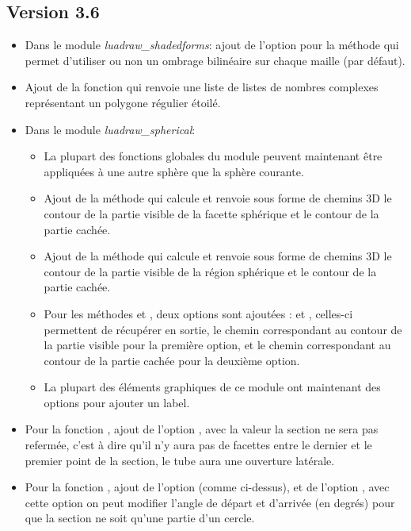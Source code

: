 \subsection{Version 3.6}
\begin{itemize}
    \item Dans le module \emph{luadraw\_shadedforms}: ajout de l'option  pour la méthode  qui permet d'utiliser ou non un ombrage bilinéaire sur chaque maille (\true par défaut).

    \item Ajout de la fonction  qui renvoie une liste de listes de nombres complexes représentant un polygone régulier étoilé.

    \item Dans le module \emph{luadraw\_spherical}:
    \begin{itemize}
        \item La plupart des fonctions globales du module peuvent maintenant être appliquées à une autre sphère que la sphère courante.
        \item Ajout de la méthode  qui calcule et renvoie sous forme de chemins 3D le contour de la partie visible de la facette sphérique et le contour de la partie cachée.
        \item Ajout de la méthode  qui calcule et renvoie sous forme de chemins 3D le contour de la partie visible de la région sphérique et le contour de la partie cachée.
        \item Pour les méthodes  et , deux options sont ajoutées :  et , celles-ci permettent de récupérer en sortie, le chemin correspondant au contour de la partie visible pour la première option, et le chemin correspondant au contour de la partie cachée pour la deuxième option.
        \item La plupart des éléments graphiques de ce module ont maintenant des options pour ajouter un label.
    \end{itemize}
    
    \item Pour la fonction , ajout de l'option , avec la valeur \true la section ne sera pas refermée, c'est à dire qu'il n'y aura pas de facettes entre le dernier et le premier point de la section, le tube aura une ouverture latérale.
    
    \item Pour la fonction , ajout de l'option  (comme ci-dessus), et de l'option , avec cette option on peut modifier l'angle de départ et d'arrivée (en degrés) pour que la section ne soit qu'une partie d'un cercle.   


\end{itemize}
